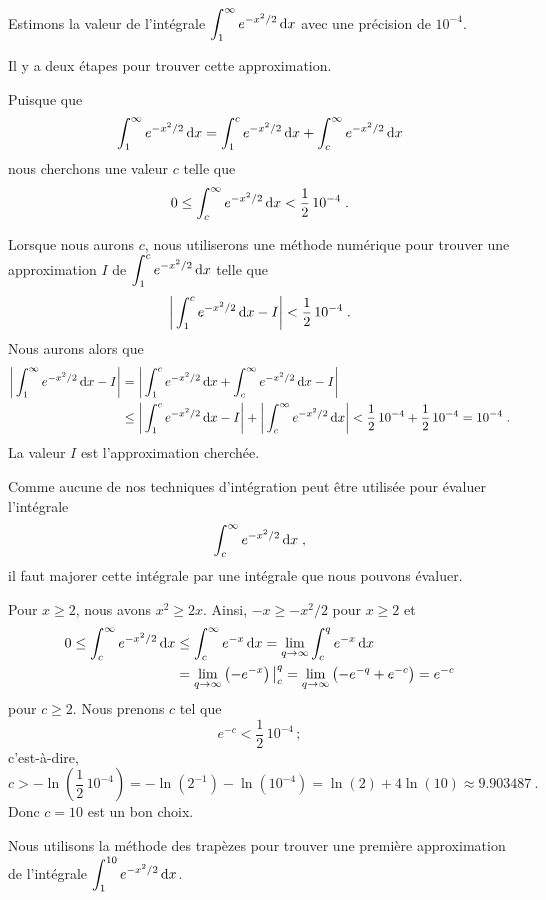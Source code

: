{\begin{egg}
Estimons la valeur de l'intégrale
$\displaystyle \int_1^\infty e^{-x^2/2} \,\mathrm{d}x$ avec une précision de
$10^{-4}$.

Il y a deux étapes pour trouver cette approximation.

 Puisque que
\[
\int_1^\infty e^{-x^2/2} \,\mathrm{d}x
= \int_1^c e^{-x^2/2} \,\mathrm{d}x + \int_c^\infty e^{-x^2/2} \,\mathrm{d}x
\]
nous cherchons une valeur $c$ telle que
\[
0 \leq \int_c^\infty e^{-x^2/2} \,\mathrm{d}x < \frac{1}{2} \, 10^{-4} \; .
\]

 Lorsque nous aurons $c$, nous utiliserons une méthode numérique
pour trouver une approximation $I$ de
$\displaystyle \int_1^c e^{-x^2/2} \,\mathrm{d}x$ telle que
\[
\bigg| \int_1^c e^{-x^2/2} \,\mathrm{d}x - I \bigg| < \frac{1}{2} \, 10^{-4} \; .
\]
Nous aurons alors que
\begin{align*}
\bigg| \int_1^{\infty} e^{-x^2/2} \,\mathrm{d}x - I \bigg| 
& = \bigg| \int_1^c e^{-x^2/2} \,\mathrm{d}x +
\int_c^{\infty} e^{-x^2/2} \,\mathrm{d}x - I \bigg| \\
& \leq \bigg| \int_1^c e^{-x^2/2} \,\mathrm{d}x - I \bigg| +
\bigg| \int_c^{\infty} e^{-x^2/2} \,\mathrm{d}x \bigg|
< \frac{1}{2} \, 10^{-4} + \frac{1}{2} \, 10^{-4} = 10^{-4} \; .
\end{align*}
La valeur $I$ est l'approximation cherchée.

 Comme aucune de nos techniques d'intégration peut être
utilisée pour évaluer l'intégrale
\[
\int_c^\infty e^{-x^2/2} \,\mathrm{d}x \; ,
\]
il faut majorer cette intégrale par une intégrale que nous pouvons
évaluer.

Pour $x\geq 2$, nous avons $x^2 \geq 2x$.  Ainsi, $-x \geq -x^2/2$ pour
$x\geq 2$ et
\begin{align*}
0\leq \int_c^\infty e^{-x^2/2} \,\mathrm{d}x & \leq \int_c^\infty e^{-x} \,\mathrm{d}x
= \lim_{q\rightarrow \infty} \int_c^q e^{-x} \,\mathrm{d}x \\
&= \lim_{q\rightarrow \infty} \left( -e^{-x} \right)\big|_c^q
= \lim_{q\rightarrow \infty} \left( -e^{-q} + e^{-c} \right)
= e^{-c}
\end{align*}
pour $c \geq 2$.  Nous prenons $c$ tel que
\[
e^{-c} < \frac{1}{2} \, 10^{-4} \, ;
\]
c'est-à-dire,
\[
c > - \ln\left(\frac{1}{2} \, 10^{-4}\right)
= -\ln\left(2^{-1}\right) - \ln\left(10^{-4}\right)
= \ln(2) + 4\ln(10) \approx 9.903487 \ .
\]
Donc $c=10$ est un bon choix.

 Nous utilisons la méthode des trapèzes pour trouver une première
approximation de l'intégrale
$\displaystyle \int_1^{10} e^{-x^2/2} \,\mathrm{d}x$.


\end{egg}}

